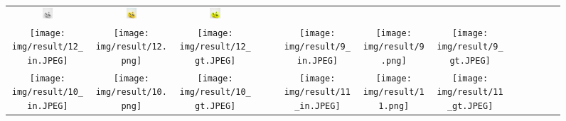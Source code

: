 \documentclass[10pt,twocolumn,letterpaper]{article}
\def\acollumsize{0.14\textwidth}
\begin{document}
\begin{figure}[t!]
\begin{center}
\begin{tabular}{ ccccccccccccc }
\includegraphics[width=\acollumsize]{img/result/8_in.JPEG}&
\includegraphics[width=\acollumsize]{img/result/8.png}&
\includegraphics[width=\acollumsize]{img/result/8_gt.JPEG}& \\

\texttt{[image: img/result/12\_in.JPEG]}&
\texttt{[image: img/result/12.png]}&
\texttt{[image: img/result/12\_gt.JPEG]}& &&

\texttt{[image: img/result/9\_in.JPEG]}&
\texttt{[image: img/result/9.png]}&
\texttt{[image: img/result/9\_gt.JPEG]}& \\


\texttt{[image: img/result/10\_in.JPEG]}&
\texttt{[image: img/result/10.png]}&
\texttt{[image: img/result/10\_gt.JPEG]}& && 

\texttt{[image: img/result/11\_in.JPEG]}&
\texttt{[image: img/result/11.png]}&
\texttt{[image: img/result/11\_gt.JPEG]}& \\


\end{tabular}
\end{center}
\end{figure}
\end{document}
